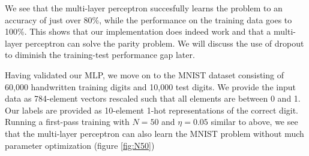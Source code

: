 \documentclass{article}
\begin{document}

We see that the multi-layer perceptron succesfully learns the problem to an accuracy of just over 80\%, while the performance on the training data goes to 100\%. This shows that our implementation does indeed work and that a multi-layer perceptron can solve the parity problem. We will discuss the use of dropout to diminish the training-test performance gap later.

Having validated our MLP, we move on to the MNIST dataset consisting of 60,000 handwritten training digits and 10,000 test digits. We provide the input data as 784-element vectors rescaled such that all elements are between 0 and 1. Our labels are provided as 10-element 1-hot representations of the correct digit.
Running a first-pass training with $N=50$ and $\eta = 0.05$ similar to above, we see that the multi-layer perceptron can also learn the MNIST problem without much parameter optimization (figure \ref{fig:N50})
\end{document}
